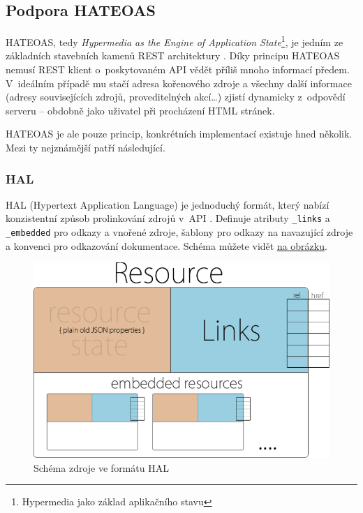 \subsection{Podpora HATEOAS}\label{podpora-hateoas}

HATEOAS, tedy \emph{Hypermedia as the Engine of Application State}\footnote{Hypermedia jako základ aplikačního stavu}, je jedním ze základních stavebních kamenů REST architektury \autocite{rest}. Díky principu HATEOAS nemusí REST klient o~poskytovaném API vědět příliš mnoho informací předem. V~ideálním případě mu stačí adresa kořenového zdroje a všechny další informace (adresy souvisejících zdrojů, proveditelných akcí\ldots{}) zjistí dynamicky z~odpovědí serveru -- obdobně jako uživatel při procházení HTML stránek.

HATEOAS je ale pouze princip, konkrétních implementací existuje hned několik. Mezi ty nejznámější patří následující.

\subsubsection*{HAL}\label{hal}

HAL (Hypertext Application Language) je jednoduchý formát, který nabízí konzistentní způsob prolinkování zdrojů v~API \autocite{hal}. Definuje atributy \verb!_links! a \verb!_embedded! pro odkazy a vnořené zdroje, šablony pro odkazy na navazující zdroje a konvenci pro odkazování dokumentace. Schéma můžete vidět \protect\hyperlink{pic:hal}{na obrázku}.

\begin{figure}
\centering
\includegraphics{images/hal}
\caption{Schéma zdroje ve formátu HAL \autocite{hal}\label{pic:hal}}
\end{figure}

